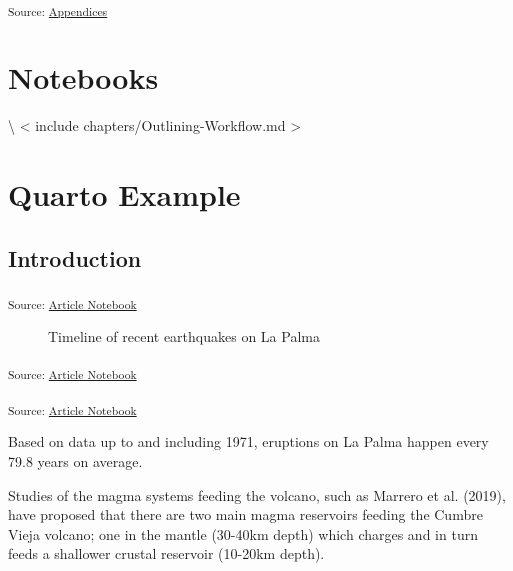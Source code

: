 \documentclass[11pt,a4paper]{report}
\begin{document}
\textsubscript{Source:
\href{https://VJMeyer.github.io/submission/chapters/Appendices-preview.html\#c986b841-c37f-45da-970d-79e87b470504}{Appendices}}

\section{Notebooks}\label{notebooks}

\textbackslash{} {{< include chapters/Outlining-Workflow.md >}}

\section{Quarto Example}\label{quarto-example}

\subsection{Introduction}\label{introduction-1}

\textsubscript{Source:
\href{https://VJMeyer.github.io/submission/thesis.qmd.html}{Article
Notebook}}

\label{cell-fig-timeline}
\begin{figure}[H]


\caption{\label{fig-timeline}Timeline of recent earthquakes on La Palma}

\end{figure}%

\textsubscript{Source:
\href{https://VJMeyer.github.io/submission/thesis.qmd.html}{Article
Notebook}}

\textsubscript{Source:
\href{https://VJMeyer.github.io/submission/thesis.qmd.html}{Article
Notebook}}

Based on data up to and including 1971, eruptions on La Palma happen
every 79.8 years on average.

Studies of the magma systems feeding the volcano, such as Marrero et al.
(2019), have proposed that there are two main magma reservoirs feeding
the Cumbre Vieja volcano; one in the mantle (30-40km depth) which
charges and in turn feeds a shallower crustal reservoir (10-20km depth).
\end{document}
